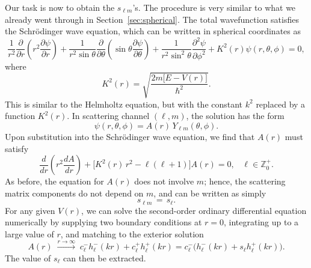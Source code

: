 \documentclass[pra,12pt]{revtex4}
\begin{document}
Our task is now to obtain the $s_{\ell m}$'s.  The procedure is very
similar to what we already went through in
Section~\ref{sec:spherical}.  The total wavefunction satisfies the
Schr\"odinger wave equation, which can be written in spherical
coordinates as
$$\frac{1}{r^2}\frac{\partial}{\partial r}\left(r^2\frac{\partial \psi}{\partial r}\right) + \frac{1}{r^2\sin\theta}\frac{\partial}{\partial\theta}\left(\sin\theta\frac{\partial\psi}{\partial\theta}\right)+\frac{1}{r^2\sin^2\theta}\frac{\partial^2\psi}{\partial\phi^2} + K^2(r) \psi(r,\theta,\phi) = 0,$$
where
$$K^2(r) = \sqrt{\frac{2m\big[E-V(r)\big]}{\hbar^2}}.$$
This is similar to the Helmholtz equation, but with the constant $k^2$
replaced by a function $K^2(r)$.  In scattering channel $(\ell,m)$,
the solution has the form
$$\psi(r,\theta,\phi) = A(r) \, Y_{\ell m}(\theta, \phi).$$
Upon substitution into the Schr\"odinger wave equation, we find that
$A(r)$ must satisfy
$$\frac{d}{dr}\left(r^2\frac{dA}{dr}\right) + \Big[K^2(r)\, r^2 - \ell(\ell+1)\Big] A(r) = 0, \;\;\;\ell \in \mathbb{Z}_0^+.$$
As before, the equation for $A(r)$ does not involve $m$; hence, the
scattering matrix components do not depend on $m$, and can be written
as simply
$$s_{\ell m} \,=\, s_\ell.$$
For any given $V(r)$, we can solve the second-order ordinary
differential equation numerically by supplying two boundary conditions
at $r=0$, integrating up to a large value of $r$, and matching to the
exterior solution
$$A(r) \; \overset{r\rightarrow\infty}{\longrightarrow} \; c^-_\ell h^-_\ell(kr) + c^+_\ell h^+_\ell(kr) = c^-_\ell \Big(h^-_\ell(kr) + s_\ell h^+_\ell(kr)\Big).$$
The value of $s_\ell$ can then be extracted.
\end{document}
